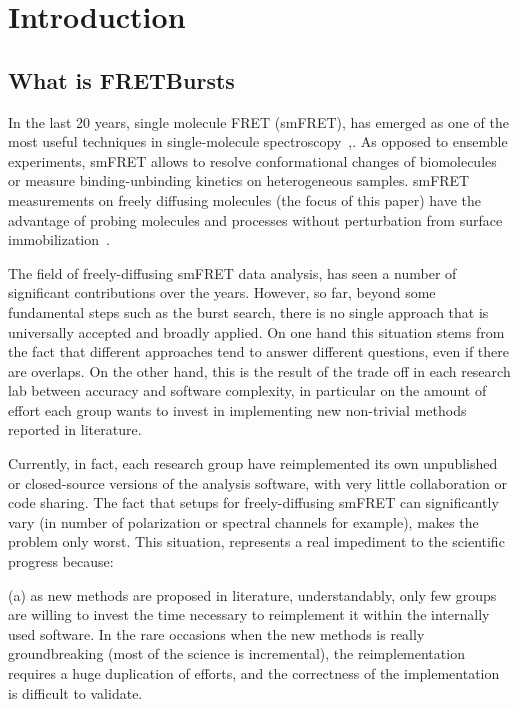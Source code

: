 \section{Introduction}

\subsection{What is FRETBursts}

In the last 20 years, single molecule FRET (smFRET), has emerged as one of the most
useful techniques in single-molecule spectroscopy~\cite{Weiss_1999},\cite{Hohlbein_2014}. 
As opposed to ensemble experiments, smFRET allows to resolve conformational 
changes of biomolecules or measure binding-unbinding kinetics on heterogeneous samples. 
smFRET measurements on freely diffusing molecules (the focus of this paper) have the advantage 
of probing molecules and processes without perturbation from surface immobilization~\cite{Dahan_1999}\cite{Eggeling_1998}. 

The field of freely-diffusing smFRET data analysis, has seen a number of significant 
contributions over the years. However, so far, beyond some fundamental steps such as the burst search, 
there is no single approach that is universally accepted and broadly applied. 
On one hand this situation stems from the fact that
different approaches tend to answer different questions, even if there are overlaps.
On the other hand, this is the result of the trade off in each research lab
between accuracy and software complexity, in particular on the amount of effort
each group wants to invest in implementing new non-trivial methods reported in literature.

Currently, in fact,
each research group have reimplemented its own unpublished or closed-source versions
of the analysis software, with very little collaboration or code sharing. 
The fact that setups for freely-diffusing smFRET can significantly 
vary (in number of polarization or spectral channels for example), 
makes the problem only worst.
This situation, represents a real impediment to the scientific progress because:

(a) as new methods are proposed in literature, understandably, only few 
groups are willing to invest the time necessary to reimplement it within 
the internally used software. In the rare occasions when the new methods 
is really groundbreaking (most of the science is incremental), the reimplementation requires 
a huge duplication of efforts, and the correctness of the implementation
is difficult to validate.

